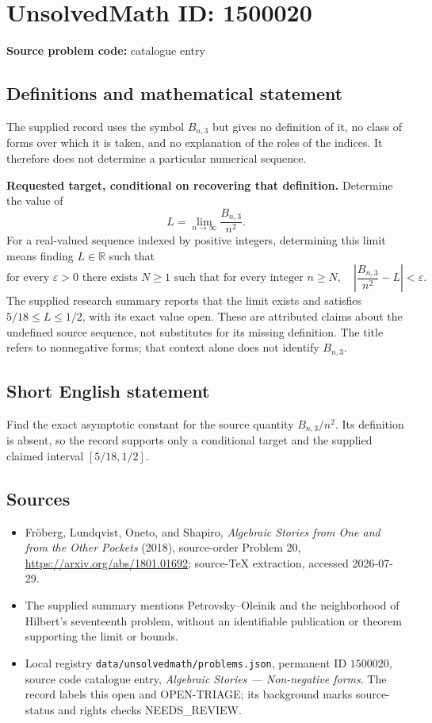 \documentclass[11pt]{article}
\begin{document}
\section*{UnsolvedMath ID: 1500020}
\textbf{Source problem code:} catalogue entry
\subsection{Definitions and mathematical statement}
The supplied record uses the symbol $B_{n,3}$ but gives no definition of it, no class of forms over which it is taken, and no explanation of the roles of the indices. It therefore does not determine a particular numerical sequence.

\textbf{Requested target, conditional on recovering that definition.} Determine the value of
\[
L=\lim_{n\to\infty}\frac{B_{n,3}}{n^2}.
\]
For a real-valued sequence indexed by positive integers, determining this limit means finding $L\in\mathbb R$ such that
\[
\text{for every }\varepsilon>0\text{ there exists }N\geq1
\text{ such that for every integer }n\geq N,
\quad\left|\frac{B_{n,3}}{n^2}-L\right|<\varepsilon.
\]
The supplied research summary reports that the limit exists and satisfies $5/18\leq L\leq1/2$, with its exact value open. These are attributed claims about the undefined source sequence, not substitutes for its missing definition. The title refers to nonnegative forms; that context alone does not identify $B_{n,3}$.
\subsection{Short English statement}
Find the exact asymptotic constant for the source quantity $B_{n,3}/n^2$. Its definition is absent, so the record supports only a conditional target and the supplied claimed interval $[5/18,1/2]$.
\subsection{Sources}
\begin{itemize}
\item Fr\"oberg, Lundqvist, Oneto, and Shapiro, \emph{Algebraic Stories from One and from the Other Pockets} (2018), source-order Problem 20, \url{https://arxiv.org/abs/1801.01692}; source-TeX extraction, accessed 2026-07-29.
\item The supplied summary mentions Petrovsky--Oleinik and the neighborhood of Hilbert's seventeenth problem, without an identifiable publication or theorem supporting the limit or bounds.
\item Local registry \texttt{data/unsolvedmath/problems.json}, permanent ID $1500020$, source code catalogue entry, \emph{Algebraic Stories --- Non-negative forms}. The record labels this open and OPEN-TRIAGE; its background marks source-status and rights checks NEEDS\_REVIEW.
\end{itemize}
\end{document}
